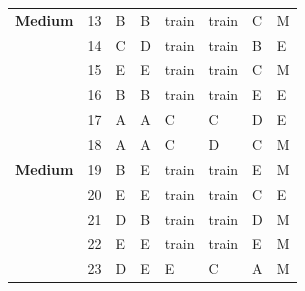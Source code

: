 \documentclass[pageno]{jpaper}
\begin{document}
\begin{table}[]
\begin{tabular}{llllllll}
\textbf{Medium}          & 13              & B                       & B                      & train                   & train                   & C                       & M                   \\
\textbf{}                & 14              & C                       & D                      & train                   & train                   & B                       & E                   \\
\textbf{}                & 15              & E                       & E                      & train                   & train                   & C                       & M                   \\
\textbf{}                & 16              & B                       & B                      & train                   & train                   & E                       & E                   \\
\textbf{}                & 17              & A                       & A                      & C                       & C                       & D                       & E                   \\
\textbf{}                & 18              & A                       & A                      & C                       & D                       & C                       & M                   \\
\textbf{Medium}          & 19              & B                       & E                      & train                   & train                   & E                       & M                   \\
\textbf{}                & 20              & E                       & E                      & train                   & train                   & C                       & E                   \\
\textbf{}                & 21              & D                       & B                      & train                   & train                   & D                       & M                   \\
\textbf{}                & 22              & E                       & E                      & train                   & train                   & E                       & M                   \\
\textbf{}                & 23              & D                       & E                      & E                       & C                       & A                       & M                   \\

\end{tabular}
\end{table}
\end{document}

